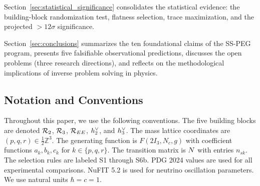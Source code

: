 Section~\ref{sec:statistical_significance} consolidates the statistical evidence: the building-block randomization test, flatness selection, trace maximization, and the projected $>12\sigma$ significance.

Section~\ref{sec:conclusions} summarizes the ten foundational claims of the SS-PEG program, presents five falsifiable observational predictions, discusses the open problems (three research directions), and reflects on the methodological implications of inverse problem solving in physics.

\subsection{Notation and Conventions}\label{sec:notation}

Throughout this paper, we use the following conventions. The five building blocks are denoted $\mathcal{R}_2$, $\mathcal{R}_3$, $\mathcal{R}_{EE}$, $h^\vee_2$, and $h^\vee_3$. The mass lattice coordinates are $(p, q, r) \in \frac{1}{2}\mathbb{Z}^3$. The generating function is $F(2I_3, N_c, g)$ with coefficient functions $a_k, b_k, c_k$ for $k \in \{p, q, r\}$. The transition matrix is $N$ with entries $n_{sk}$. The selection rules are labeled S1 through S6b. PDG 2024 values are used for all experimental comparisons. NuFIT 5.2 is used for neutrino oscillation parameters. We use natural units $\hbar = c = 1$.
